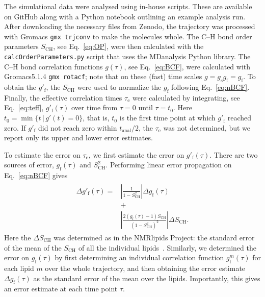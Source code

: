 \documentclass[journal=jpcbfk,manuscript=article,layout=twocolumn]{achemso}
\begin{document}
The simulational data were analysed using in-house scripts. These are available on GitHub \cite{citehere} along with a Python notebook outlining an example analysis run.
After downloading the necessary files from Zenodo, the trajectory was processed with Gromacs \texttt{gmx trjconv} to make the molecules whole.
The C--H bond order parameters  $S_\mathrm{CH}$, see Eq.~\eqref{eq:OP}, were then calculated with the \texttt{calcOrderParameters.py}\cite{citegithubhere} script that uses the MDanalysis\cite{XXX} Python library.
%
The \mbox{C--H} bond correlation functions
$g(\tau)$, see Eq.~\eqref{eq:BCF},
were calculated with Gromacs5.1.4\cite{XXX} \texttt{gmx rotacf};
note that on these (fast) time scales $g = g_\mathrm{s} g_\mathrm{f}= g_\mathrm{f}$.
%
To obtain the $g'_\mathrm f$,
the $S_\mathrm{CH}$ were used to
normalize the $g_\mathrm f$ following Eq.~\eqref{eq:nBCF}.
%
Finally, the effective correlation times $\tau_\mathrm e$ were calculated by integrating, see Eq.~\eqref{eq:teff},
$g'_\mathrm f(\tau)$ over time from $\tau=0$ until $\tau = t_0$.
Here
$t_0 = \min
	\{
	t\,|\,g'(t)=0
	\}
$,
that is, $t_\mathrm 0$ is the first time point at which $g'_\mathrm f$ reached zero.
%
If $g'_\mathrm f$ did not reach zero within 
$t_\mathrm{anal}/2$, the 
$\tau_\mathrm e$ was not determined,
but we report only its upper and lower error estimates.

To estimate the error on $\tau_\mathrm e$, we first estimate the error on $g'_\mathrm f(\tau)$.
%
There are two sources of error, $g_{\mathrm{f}}(\tau)$ and $S^2_\mathrm{CH}$.
%
Performing linear error propagation on Eq.~\eqref{eq:nBCF} gives
\begin{align}
\begin{split}
\label{eq:error}
\Delta g'_{\mathrm{f}}(\tau)
=
&\left|
	\frac{1}{1-S^2_\mathrm{CH}}
\right|
\Delta g_{\mathrm{f}}(\tau)\\
&+\\
&\left|
	\frac{2\left(g_\mathrm{f}(\tau)-1\right)S_\mathrm{CH}}{\left(1-S^2_\mathrm{CH}\right)^2}
\right|
\Delta S_\mathrm{CH}.
\end{split}
\end{align}
Here the $\Delta S_\mathrm{CH}$ was determined as in the NMR\-lipids Project:
the standard error of the mean of the $S_\mathrm{CH}$ of all the individual lipids~\cite{botan15}.
%
Similarly, we determined the error on $g_{\mathrm{f}}(\tau)$
by first determining an individual correlation function $g^m_{\mathrm{f}}(\tau)$ for each lipid $m$
over the whole trajectory, and then obtaining the error estimate
$\Delta g_{\mathrm{f}}(\tau)$
as the standard error of the mean over the lipids.
%
Importantly, this gives an error estimate at each time point $\tau$.
\end{document}
